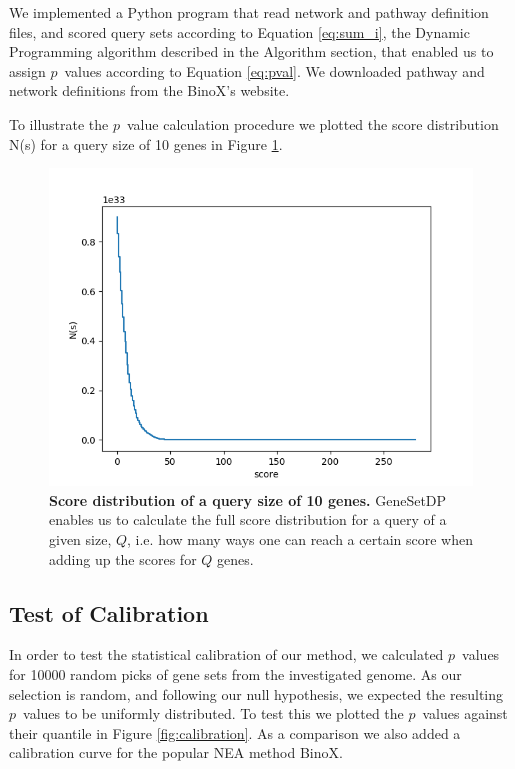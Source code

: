 \documentclass[a4paper,american]{lipics-v2016}
\begin{document}
We implemented a Python program that read network and pathway definition files, and scored query sets according to Equation \ref{eq:sum_i}, the Dynamic Programming algorithm described in the Algorithm section, that enabled us to assign $p$~values according to Equation \ref{eq:pval}. We downloaded pathway and network definitions from the BinoX's website.

To illustrate the $p$~value calculation procedure we plotted the score distribution N(s) for a query size of 10 genes in Figure \ref{fig:score_dist}.

\begin{figure}[htb]
		\begin{center}
				\includegraphics[scale=0.8]{figures/F1_score_distribuition.png}
		\end{center}
  \caption{{\bf Score distribution of a query size of 10 genes.} GeneSetDP enables us to calculate the full score distribution for a query of a given size, $Q$, i.e. how many ways one can reach a certain score when adding up the scores for $Q$ genes.}
  \label{fig:score_dist}
\end{figure}

\subsection*{Test of Calibration}

In order to test the statistical calibration of our method, we calculated $p$~values for 10000 random picks of gene sets from the investigated genome. As our selection is random, and following our null hypothesis, we expected the resulting $p$~values to be uniformly distributed. To test this we plotted the $p$~values against their quantile in Figure \ref{fig:calibration}. As a comparison we also added a calibration curve for the popular NEA method BinoX\cite{ogris2016novel}.
\end{document}
